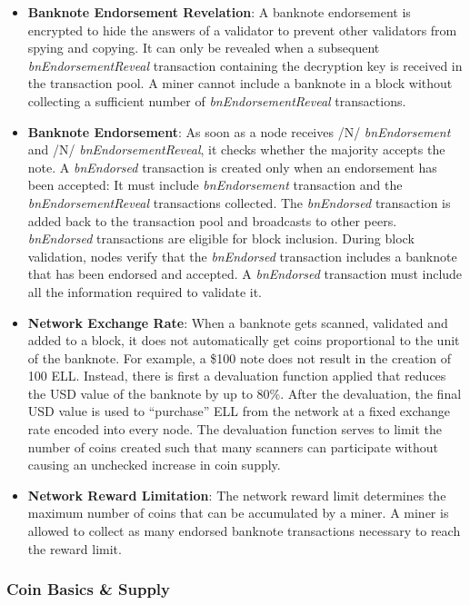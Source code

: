 \begin{itemize}
	\item \textbf{Banknote Endorsement Revelation}: A banknote endorsement is encrypted to hide the answers of a validator to prevent other validators from spying and copying. It can only be revealed when a subsequent \textit{bnEndorsementReveal} transaction containing the decryption key is received in the transaction pool. A miner cannot include a banknote in a block without collecting a sufficient number of \textit{bnEndorsementReveal} transactions.
	\item \textbf{Banknote Endorsement}: As soon as a node receives /N/ \textit{bnEndorsement} and /N/ \textit{bnEndorsementReveal}, it checks whether the majority accepts the note. A \textit{bnEndorsed} transaction is created only when an endorsement has been accepted: It must include \textit{bnEndorsement} transaction and the \textit{bnEndorsementReveal} transactions collected. The \textit{bnEndorsed} transaction is added back to the transaction pool and broadcasts to other peers. \textit{bnEndorsed} transactions are eligible for block inclusion. During block validation, nodes verify that the \textit{bnEndorsed} transaction includes a banknote that has been endorsed and accepted. A \textit{bnEndorsed} transaction must include all the information required to validate it.
	\item \textbf{Network Exchange Rate}: When a banknote gets scanned, validated and added to a block, it does not automatically get coins proportional to the unit of the banknote. For example, a \$100 note does not result in the creation of 100 ELL. Instead, there is first a devaluation function applied that reduces the USD value of the banknote by up to 80\%. After the devaluation, the final USD value is used to “purchase” ELL from the network at a fixed exchange rate encoded into every node. The devaluation function serves to limit the number of coins created such that many scanners can participate without causing an unchecked increase in coin supply.
	\item \textbf{Network Reward Limitation}: The network reward limit determines the maximum number of coins that can be accumulated by a miner. A miner is allowed to collect as many endorsed banknote transactions necessary to reach the reward limit.
\end{itemize}

\subsubsection{Coin Basics \& Supply}

